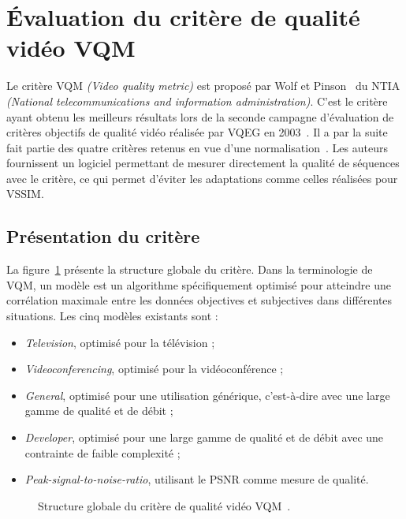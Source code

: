 \section{Évaluation du critère de qualité vidéo VQM} \label{ssec:evalVQM}
Le critère VQM \emph{(Video quality metric)} est proposé par Wolf et Pinson~\cite{wolf-vqmtech} du NTIA \emph{(National telecommunications and information administration)}. C'est le critère ayant obtenu les meilleurs résultats lors de la seconde campagne d'évaluation de critères objectifs de qualité vidéo réalisée par VQEG en 2003~\cite{vqeg-frtv2}. Il a par la suite fait partie des quatre critères retenus en vue d'une normalisation~\cite{itu-j144}. Les auteurs fournissent un logiciel permettant de mesurer directement la qualité de séquences avec le critère, ce qui permet d'éviter les adaptations comme celles réalisées pour VSSIM.


\subsection{Présentation du critère}
La figure~\ref{fig:vqmGlobal} présente la structure globale du critère. Dans la terminologie de VQM, un modèle est un algorithme spécifiquement optimisé pour atteindre une corrélation maximale entre les données objectives et subjectives dans différentes situations. Les cinq modèles existants sont :
\begin{itemize}
\item \emph{Television}, optimisé pour la télévision ;
\item \emph{Videoconferencing}, optimisé pour la vidéoconférence ;
\item \emph{General}, optimisé pour une utilisation générique, c'est-à-dire avec une large gamme de qualité et de débit ;
\item \emph{Developer}, optimisé pour une large gamme de qualité et de débit avec une contrainte de faible complexité ;
\item \emph{Peak-signal-to-noise-ratio}, utilisant le PSNR comme mesure de qualité.
\end{itemize}

\begin{figure}[htbp]
	\centering
	\begin{tikzpicture}[text centered,text width=2cm,node distance=1.5cm]\end{tikzpicture}
	\caption{Structure globale du critère de qualité vidéo VQM~\cite{wolf-vqmtech}.}
	\label{fig:vqmGlobal}
\end{figure}

